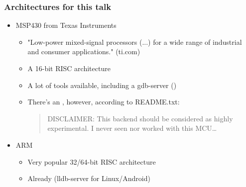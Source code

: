 \begin{frame}[fragile]
\frametitle{Architectures for this talk}
\begin{itemize}
\vspace{3pt}
\item MSP430 from Texas Instruments
    \begin{itemize}
\setlength\itemsep{1em}
        \item "Low-power mixed-signal processors (...) for a wide range of industrial and consumer applications." (ti.com)
        \item A 16-bit RISC architecture 
        \item A lot of tools available, including a gdb-server ()
        \item There's an , however, according to README.txt:
            \begin{quote}
                \scriptsize
    DISCLAIMER: This backend should be considered as highly experimental. I never
seen nor worked with this MCU\ldots
\end{quote}
    \end{itemize}
\vspace{5pt}
\item ARM
\setlength\itemsep{1em}
    \begin{itemize}
\setlength\itemsep{1em}
        \item Very popular 32/64-bit RISC architecture
        \item Already  (lldb-server for Linux/Android)
    \end{itemize}
\end{itemize}
\end{frame}

